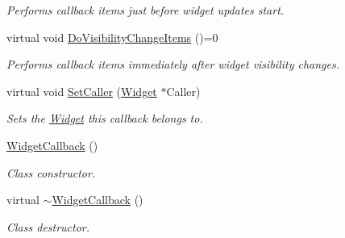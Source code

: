 \begin{DoxyCompactItemize}
\begin{DoxyCompactList}\small\item\em Performs callback items just before widget updates start. \item\end{DoxyCompactList}\item 
\hypertarget{classMezzanine_1_1UI_1_1WidgetCallback_a798717ddccdbb565c2284344b2ee0a63}{
virtual void \hyperlink{classMezzanine_1_1UI_1_1WidgetCallback_a798717ddccdbb565c2284344b2ee0a63}{DoVisibilityChangeItems} ()=0}
\label{classMezzanine_1_1UI_1_1WidgetCallback_a798717ddccdbb565c2284344b2ee0a63}

\begin{DoxyCompactList}\small\item\em Performs callback items immediately after widget visibility changes. \item\end{DoxyCompactList}\item 
\hypertarget{classMezzanine_1_1UI_1_1WidgetCallback_a3f3cc50759dfaff6c1af839595833a33}{
virtual void \hyperlink{classMezzanine_1_1UI_1_1WidgetCallback_a3f3cc50759dfaff6c1af839595833a33}{SetCaller} (\hyperlink{classMezzanine_1_1UI_1_1Widget}{Widget} $\ast$Caller)}
\label{classMezzanine_1_1UI_1_1WidgetCallback_a3f3cc50759dfaff6c1af839595833a33}

\begin{DoxyCompactList}\small\item\em Sets the \hyperlink{classMezzanine_1_1UI_1_1Widget}{Widget} this callback belongs to. \item\end{DoxyCompactList}\item 
\hypertarget{classMezzanine_1_1UI_1_1WidgetCallback_a7d42c424322e006792251a727bf7f2c7}{
\hyperlink{classMezzanine_1_1UI_1_1WidgetCallback_a7d42c424322e006792251a727bf7f2c7}{WidgetCallback} ()}
\label{classMezzanine_1_1UI_1_1WidgetCallback_a7d42c424322e006792251a727bf7f2c7}

\begin{DoxyCompactList}\small\item\em Class constructor. \item\end{DoxyCompactList}\item 
\hypertarget{classMezzanine_1_1UI_1_1WidgetCallback_ad0f5cbd659849f3f69e1b1637c63402a}{
virtual \hyperlink{classMezzanine_1_1UI_1_1WidgetCallback_ad0f5cbd659849f3f69e1b1637c63402a}{$\sim$WidgetCallback} ()}
\label{classMezzanine_1_1UI_1_1WidgetCallback_ad0f5cbd659849f3f69e1b1637c63402a}

\begin{DoxyCompactList}\small\item\em Class destructor. \item\end{DoxyCompactList}\end{DoxyCompactItemize}
